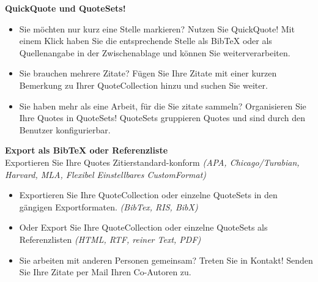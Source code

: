 \documentclass[a4paper,12pt]{article}
\begin{document}
\textbf{QuickQuote und QuoteSets!}
\begin{itemize}
	\item Sie möchten nur kurz eine Stelle markieren? Nutzen Sie QuickQuote! Mit einem Klick haben Sie die entsprechende Stelle als BibTeX oder als Quellenangabe in der Zwischenablage und können Sie weiterverarbeiten.
	\item Sie brauchen mehrere Zitate? Fügen Sie Ihre Zitate mit einer kurzen Bemerkung zu Ihrer QuoteCollection hinzu und suchen Sie weiter.
	\item Sie haben mehr als eine Arbeit, für die Sie zitate sammeln? Organisieren Sie Ihre Quotes in QuoteSets! QuoteSets gruppieren Quotes und sind durch den Benutzer konfigurierbar.
\end{itemize}

\textbf{Export als BibTeX oder Referenzliste}\\
Exportieren Sie Ihre Quotes Zitierstandard-konform \textit{(APA, Chicago/Turabian, Harvard, MLA, Flexibel Einstellbares CustomFormat)}
\begin{itemize}
	\item Exportieren Sie Ihre QuoteCollection oder einzelne QuoteSets in den gängigen Exportformaten. \textit{(BibTex, RIS, BibX)}
	\item Oder Export Sie Ihre QuoteCollection oder einzelne QuoteSets als Referenzlisten \textit{(HTML, RTF, reiner Text, PDF)}
	\item Sie arbeiten mit anderen Personen gemeinsam? Treten Sie in Kontakt! Senden Sie Ihre Zitate per Mail Ihren Co-Autoren zu.
\end{itemize}



\pagebreak
\end{document}
